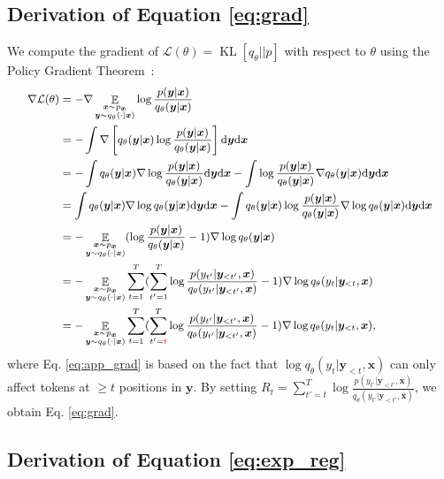\documentclass{article}
\def\expct{\mathop{\mathbb{E}}}
\def\pst{q_{\theta}(y_t | \by_{<t}, \bx)}
\def\pstp{q_{\theta}(y_{t'} | \by_{<t'}, \bx)}
\def\pttp{p(y_{t'} | \by_{<t'}, \bx)}
\def\revkl{\operatorname{KL}[q_\theta||p]}
\def\ps{q_\theta}
\def\pt{p}
\def\bx{\bm{x}}
\def\by{\bm{y}}
\def\R{\log \frac{\pt (\by | \bx)}{\ps (\by | \bx)}}
\def\dy{\mathrm{d} \by}
\def\dx{\mathrm{d} \bx}
\begin{document}
\subsection{Derivation of Equation \ref{eq:grad}}
\label{app:grad}
We compute the gradient of $\mathcal{L}(\theta)=\revkl$ with respect to $\theta$ using the Policy Gradient Theorem~\citep{policy_gradient}:
\begin{equation}
\small
\begin{aligned}
    \nabla \mathcal{L}(\theta) 
    &= -\nabla \expct_{\substack{\bx \sim p_{\bx} \\ \by \sim \ps (\cdot | \bx)}} \R \\
    &= -\int \nabla \left[\ps (\by | \bx) \R \right] \dy \dx\\
    &= -\int \ps(\by | \bx) \nabla \R \dy \dx - \int \R \nabla \ps(\by|\bx) \dy \dx \\
    &= \int \ps(\by | \bx) \nabla \log \ps(\by|\bx)\dy \dx - \int \ps(\by|\bx) \R \nabla \log \ps(\by|\bx) \dy \dx \\
    &= -\expct_{\substack{\bx \sim p_{\bx} \\ \by \sim \ps (\cdot | \bx)}} (\R - 1) \nabla \log \ps (\by | \bx) \\
    &= -\expct_{\substack{\bx \sim p_{\bx} \\ \by \sim \ps (\cdot | \bx)}} \sum_{t=1}^T (\sum_{t'=1}^T \log \frac{\pttp}{\pstp} - 1) \nabla \log \pst \\
    &= -\expct_{\substack{\bx \sim p_{\bx} \\ \by \sim \ps (\cdot | \bx)}} \sum_{t=1}^T (\sum^T_{t'=\color{red}{t}} \log \frac{\pttp}{\pstp} - 1) \nabla \log \pst, \label{eq:app_grad}
\end{aligned}
\end{equation}
where Eq. \ref{eq:app_grad} is based on the fact that $\log \pst$ can only affect tokens at $\ge t$ positions in $\by$. By setting $R_t =  \sum_{t'=t}^T \log \frac{\pttp}{\pstp}$, we obtain Eq. \ref{eq:grad}.

\subsection{Derivation of Equation \ref{eq:exp_reg}}
\label{app:exp_reg}
\end{document}

